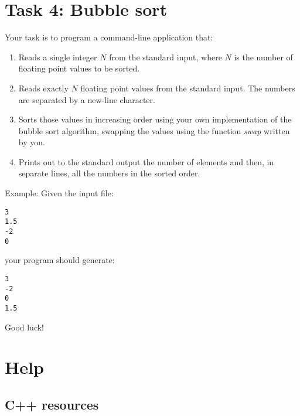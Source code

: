 \section{Task 4: Bubble sort}

Your task is to program a command-line application that:
\begin{enumerate}
	\item Reads a single integer $N$ from the standard input, where $N$ is the number of floating point values to be sorted. 
	\item Reads exactly $N$ floating point values from the standard input. The numbers are separated by a new-line character.
	\item Sorts those values in increasing order using your own implementation of the bubble sort algorithm, swapping the values using the function \emph{swap} written by you. 
	\item Prints out to the standard output the number of elements and then, in separate lines, all the numbers in the sorted order.
\end{enumerate}


Example: Given the input file:
\begin{verbatim}
3
1.5
-2
0
\end{verbatim}
your program should generate:
\begin{verbatim}
3
-2
0
1.5
\end{verbatim}


Good luck!

\section{Help}


\subsection{C++ resources}

